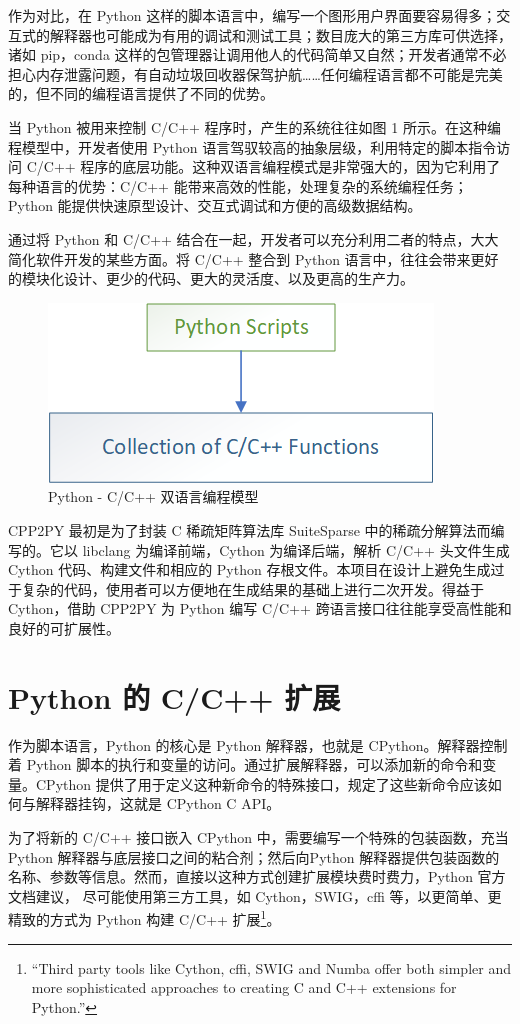 作为对比，在 Python 这样的脚本语言中，编写一个图形用户界面要容易得多；交互式的解释器也可能成为有用的调试和测试工具；数目庞大的第三方库可供选择，诸如 pip，conda 这样的包管理器让调用他人的代码简单又自然；开发者通常不必担心内存泄露问题，有自动垃圾回收器保驾护航……任何编程语言都不可能是完美的，但不同的编程语言提供了不同的优势。

当 Python 被用来控制 C/C++ 程序时，产生的系统往往如图 1 所示。在这种编程模型中，开发者使用 Python 语言驾驭较高的抽象层级，利用特定的脚本指令访问 C/C++ 程序的底层功能。这种双语言编程模式是非常强大的，因为它利用了每种语言的优势：C/C++ 能带来高效的性能，处理复杂的系统编程任务；Python 能提供快速原型设计、交互式调试和方便的高级数据结构。

通过将 Python 和 C/C++ 结合在一起，开发者可以充分利用二者的特点，大大简化软件开发的某些方面。将 C/C++ 整合到 Python 语言中，往往会带来更好的模块化设计、更少的代码、更大的灵活度、以及更高的生产力。

\begin{figure}
  \centering
  \includegraphics[width=0.5\linewidth]{figures/双语模型.png}
  \caption{Python - C/C++ 双语言编程模型}
  \label{fig:1}
\end{figure}

CPP2PY 最初是为了封装 C 稀疏矩阵算法库 SuiteSparse 中的稀疏分解算法而编写的。它以 libclang 为编译前端，Cython 为编译后端，解析 C/C++ 头文件生成 Cython 代码、构建文件和相应的 Python 存根文件。本项目在设计上避免生成过于复杂的代码，使用者可以方便地在生成结果的基础上进行二次开发。得益于 Cython，借助 CPP2PY 为 Python 编写 C/C++ 跨语言接口往往能享受高性能和良好的可扩展性。

\section{Python 的 C/C++ 扩展}

作为脚本语言，Python 的核心是 Python 解释器，也就是 CPython。解释器控制着 Python 脚本的执行和变量的访问。通过扩展解释器，可以添加新的命令和变量。CPython 提供了用于定义这种新命令的特殊接口，规定了这些新命令应该如何与解释器挂钩，这就是 CPython C API\cite{pyc}。

为了将新的 C/C++ 接口嵌入 CPython 中，需要编写一个特殊的包装函数，充当 Python 解释器与底层接口之间的粘合剂；然后向Python 解释器提供包装函数的名称、参数等信息。然而，直接以这种方式创建扩展模块费时费力，Python 官方文档建议， 尽可能使用第三方工具，如 Cython，SWIG，cffi 等，以更简单、更精致的方式为 Python 构建 C/C++ 扩展\footnote{“Third party tools like Cython, cffi, SWIG and Numba offer both simpler and more sophisticated approaches to creating C and C++ extensions for Python.”}。

